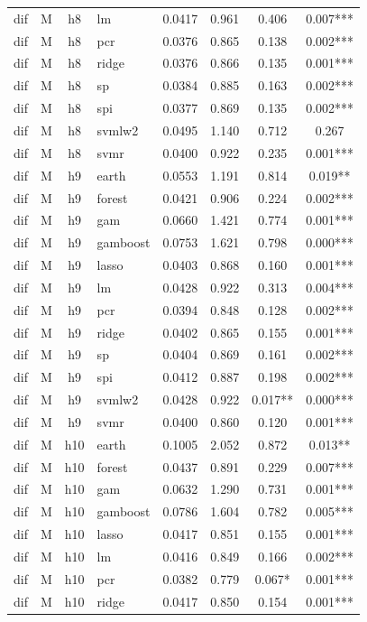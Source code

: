 \begin{ThreePartTable}
\begin{longtable}[t]{llclcccc}
dif & M & h8 & lm & 0.0417 & 0.961 & 0.406 & 0.007***\\
dif & M & h8 & pcr & 0.0376 & 0.865 & 0.138 & 0.002***\\
dif & M & h8 & ridge & 0.0376 & 0.866 & 0.135 & 0.001***\\
dif & M & h8 & sp & 0.0384 & 0.885 & 0.163 & 0.002***\\
dif & M & h8 & spi & 0.0377 & 0.869 & 0.135 & 0.002***\\
dif & M & h8 & svmlw2 & 0.0495 & 1.140 & 0.712 & 0.267\\
dif & M & h8 & svmr & 0.0400 & 0.922 & 0.235 & 0.001***\\
\addlinespace
dif & M & h9 & earth & 0.0553 & 1.191 & 0.814 & 0.019**\\
dif & M & h9 & forest & 0.0421 & 0.906 & 0.224 & 0.002***\\
dif & M & h9 & gam & 0.0660 & 1.421 & 0.774 & 0.001***\\
dif & M & h9 & gamboost & 0.0753 & 1.621 & 0.798 & 0.000***\\
dif & M & h9 & lasso & 0.0403 & 0.868 & 0.160 & 0.001***\\
dif & M & h9 & lm & 0.0428 & 0.922 & 0.313 & 0.004***\\
dif & M & h9 & pcr & 0.0394 & 0.848 & 0.128 & 0.002***\\
dif & M & h9 & ridge & 0.0402 & 0.865 & 0.155 & 0.001***\\
dif & M & h9 & sp & 0.0404 & 0.869 & 0.161 & 0.002***\\
dif & M & h9 & spi & 0.0412 & 0.887 & 0.198 & 0.002***\\
dif & M & h9 & svmlw2 & 0.0428 & 0.922 & 0.017** & 0.000***\\
dif & M & h9 & svmr & 0.0400 & 0.860 & 0.120 & 0.001***\\
\addlinespace
dif & M & h10 & earth & 0.1005 & 2.052 & 0.872 & 0.013**\\
dif & M & h10 & forest & 0.0437 & 0.891 & 0.229 & 0.007***\\
dif & M & h10 & gam & 0.0632 & 1.290 & 0.731 & 0.001***\\
dif & M & h10 & gamboost & 0.0786 & 1.604 & 0.782 & 0.005***\\
dif & M & h10 & lasso & 0.0417 & 0.851 & 0.155 & 0.001***\\
dif & M & h10 & lm & 0.0416 & 0.849 & 0.166 & 0.002***\\
dif & M & h10 & pcr & 0.0382 & 0.779 & 0.067* & 0.001***\\
dif & M & h10 & ridge & 0.0417 & 0.850 & 0.154 & 0.001***\\

\end{longtable}
\end{ThreePartTable}
